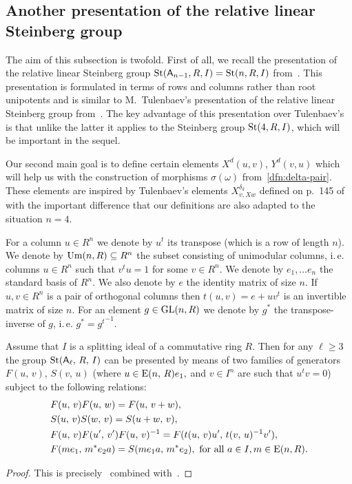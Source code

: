 \subsection{Another presentation of the relative linear Steinberg group} \label{subsec:rel-presentation}
The aim of this subsection is twofold.
First of all, we recall the presentation of the relative linear Steinberg group $\operatorname{St}(\mathsf{A}_{n-1}, R, I) = \operatorname{St}(n, R, I)$ from~\cite{LS17}.
This presentation is formulated in terms of rows and columns rather than root unipotents and is similar to
 M.~Tulenbaev's presentation of the relative linear Steinberg group from~\cite[Definition~1.5]{Tu83}.
The key advantage of this presentation over Tulenbaev's is that unlike the latter it applies to the Steinberg group $\operatorname{St}(4, R, I)$,
 which will be important in the sequel.

Our second main goal is to define certain elements $X^d(u, v)$, $Y^d(v, u)$ which will help us
 with the construction of morphisms $\sigma(\omega)$ from~\cref{dfn:delta-pair}.
These elements are inspired by Tulenbaev's elements $X_{v, Xw}^{\delta_k}$ defined on p.~145 of~\cite{Tu83} with
 the important difference that our definitions are also adapted to the situation $n=4$.

For a column $u \in R^n$ we denote by $u^t$ its transpose (which is a row of length $n$).
We denote by $\operatorname{Um}(n, R) \subseteq R^n$ the subset consisting of unimodular columns,
i.\,e. columns $u \in R^n$ such that $v^t u = 1$ for some $v \in R^n$.
We denote by $e_1, \ldots e_n$ the standard basis of $R^n$.
We also denote by $e$ the identity matrix of size $n$.
If $u, v \in R^n$ is a pair of orthogonal columns then $t(u, v) = e + uv^t$ is an invertible matrix of size $n.$
For an element $g \in \operatorname{GL}(n, R)$ we denote by $g^*$ the transpose-inverse of $g$, i.\,e. $g^* = {g^{t}}^{-1}.$

\begin{prop}
    \label{prop:rel-presentation}
    Assume that $I$ is a splitting ideal of a commutative ring $R$.
    Then for any $\ell\geq 3$ the group $\operatorname{St}(\mathsf{A}_\ell,\,R,\,I)$ can be presented by means of two families of generators $F(u,\,v)$, $S(v,\,u)$
    (where $u\in \operatorname{E}(n,\,R)e_1,$ and $v\in I^n$ are such that $u^{t}v=0$) subject to the following relations:
    \begin{align}
        &F(u,\,v)F(u,\,w)=F(u,\,v+w), \label{add4}\\
        &S(u,\,v)S(w,\,v)=S(u+w,\,v), \label{add5}\\
        &F(u,\,v)F(u',\,v')F(u,\,v)^{-1}=F(t(u,\,v)u',\,t(v,\,u)^{-1} v'), \label{conj3} \\
        &F(me_1,\,m^{*}e_{2}a)=S(me_{1}a,\,m^{*}e_{2}),\ \text{for all $a\in I$,}\, m \in \operatorname{E}(n, R). \label{coef-move}
    \end{align}
\end{prop}
\begin{proof}
    This is precisely~\cite[Proposition 3.10]{LS17} combined with~\cite[Proposition~8]{S15}.
\end{proof}

